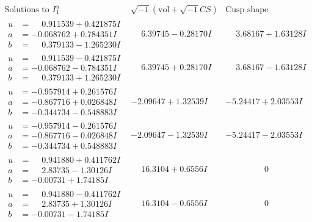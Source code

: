 \documentclass[1p]{elsarticle_modified}
\theoremstyle{definition}
\newcommand{\I}{\sqrt{-1}}
\begin{document}
$$\begin{array}{c|c|c}  
\text{Solutions to }I^u_{1}& \I (\text{vol} + \sqrt{-1}CS) & \text{Cusp shape}\\
 \hline 
\begin{aligned}
u &= \phantom{-}0.911539 + 0.421875 I \\
a &= -0.068762 + 0.784351 I \\
b &= \phantom{-}0.379133 - 1.265230 I\end{aligned}
 & \phantom{-}6.39745 - 0.28170 I & \phantom{-}3.68167 + 1.63128 I \\ \hline\begin{aligned}
u &= \phantom{-}0.911539 - 0.421875 I \\
a &= -0.068762 - 0.784351 I \\
b &= \phantom{-}0.379133 + 1.265230 I\end{aligned}
 & \phantom{-}6.39745 + 0.28170 I & \phantom{-}3.68167 - 1.63128 I \\ \hline\begin{aligned}
u &= -0.957914 + 0.261576 I \\
a &= -0.867716 + 0.026848 I \\
b &= -0.344734 - 0.548883 I\end{aligned}
 & -2.09647 + 1.32539 I & -5.24417 + 2.03553 I \\ \hline\begin{aligned}
u &= -0.957914 - 0.261576 I \\
a &= -0.867716 - 0.026848 I \\
b &= -0.344734 + 0.548883 I\end{aligned}
 & -2.09647 - 1.32539 I & -5.24417 - 2.03553 I \\ \hline\begin{aligned}
u &= \phantom{-}0.941880 + 0.411762 I \\
a &= \phantom{-}2.83735 - 1.30126 I \\
b &= -0.00731 + 1.74185 I\end{aligned}
 & \phantom{-}16.3104 + 0.6556 I & \phantom{-0.000000 } 0 \\ \hline\begin{aligned}
u &= \phantom{-}0.941880 - 0.411762 I \\
a &= \phantom{-}2.83735 + 1.30126 I \\
b &= -0.00731 - 1.74185 I\end{aligned}
 & \phantom{-}16.3104 - 0.6556 I & \phantom{-0.000000 } 0 \\ \hline\begin{aligned}

\end{aligned}
\end{array}$$
\end{document}
